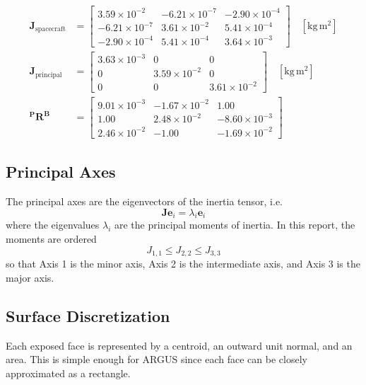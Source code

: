 \documentclass[conference,onecolumn,draftclsnofoot]{IEEEtran}
\begin{document}
\begin{align}
\mathbf{J}_{\text{spacecraft}} &=
\begin{bmatrix}
3.59\times10^{-2} & -6.21\times10^{-7} & -2.90\times10^{-4} \\
-6.21\times10^{-7} & 3.61\times10^{-2} & 5.41\times10^{-4} \\
-2.90\times10^{-4} & 5.41\times10^{-4} & 3.64\times10^{-3}
\end{bmatrix}
\quad [\mathrm{kg\,m^2}]\\
\mathbf{J}_{\text{principal}} &=
\begin{bmatrix}
3.63\times10^{-3} & 0 & 0 \\
0 & 3.59\times10^{-2} & 0 \\
0 & 0 & 3.61\times10^{-2}
\end{bmatrix}
\quad [\mathrm{kg\,m^2}]\\
\mathbf{{}^{P}R^{B}} &=
\begin{bmatrix}
9.01\times10^{-3} & -1.67\times10^{-2} & 1.00 \\
1.00 & 2.48\times10^{-2} & -8.60\times10^{-3} \\
2.46\times10^{-2} & -1.00 & -1.69\times10^{-2}
\end{bmatrix}
\end{align}

\vspace{1em}

\subsection{Principal Axes}
The principal axes are the eigenvectors of the inertia tensor, i.e.
\begin{equation}
\mathbf{J}\mathbf{e}_i = \lambda_i \mathbf{e}_i
\end{equation}
where the eigenvalues $\lambda_i$ are the principal moments of inertia. In this report, the moments are ordered
\begin{equation}
J_{1,1} \le J_{2,2} \le J_{3,3}
\end{equation}
so that Axis 1 is the minor axis, Axis 2 is the intermediate axis, and Axis 3 is the major axis.

\subsection{Surface Discretization}
Each exposed face is represented by a centroid, an outward unit normal, and an area. This is simple enough for ARGUS since each face can be closely approximated as a rectangle. 
\end{document}
